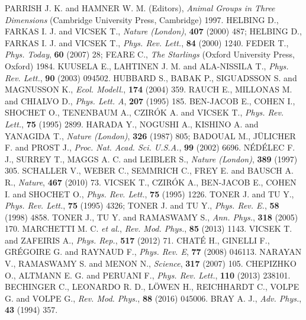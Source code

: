 \documentclass[pre,twocolumn,amssymb,showpacs,superscriptaddress,notitlepage]{revtex4-1}
\begin{document}
\begin{thebibliography}{10}
%
 PARRISH J. K. and HAMNER W. M. (Editors), {\it Animal Groups in Three Dimensions} (Cambridge University Press, Cambridge) 1997.
%
 HELBING D., FARKAS I. J. and VICSEK T., {\it Nature (London)}, {\bf 407} (2000) 487;
HELBING D., FARKAS I. J. and VICSEK T., {\it Phys. Rev. Lett.}, {\bf 84} (2000) 1240.
%
 FEDER T., {\it Phys. Today}, {\bf 60} (2007) 28; 
FEARE C., {\it The Starlings} (Oxford University Press, Oxford) 1984.
%
 KUUSELA E., LAHTINEN J. M. and ALA-NISSILA T., {\it Phys. Rev. Lett.}, {\bf 90} (2003) 094502.
%
 HUBBARD S., BABAK P., SIGUADSSON S. and MAGNUSSON K., {\it Ecol. Modell.}, {\bf 174} (2004) 359.
%
 RAUCH E., MILLONAS M. and CHIALVO D., {\it Phys. Lett. A}, {\bf 207} (1995) 185.
%
 BEN-JACOB E., COHEN I., SHOCHET O., TENENBAUM A., CZIR\'{O}K A. and VICSEK T., {\it Phys. Rev. Lett.}, {\bf 75} (1995) 2899.
%
 HARADA Y., NOGUSHI A., KISHINO A. and YANAGIDA T., {\it Nature (London)}, {\bf 326} (1987) 805;
BADOUAL M., J\"{U}LICHER F. and PROST J., {\it Proc. Nat. Acad. Sci. U.S.A.}, {\bf 99} (2002) 6696.
%
 N\'{E}D\'{E}LEC F. J., SURREY T., MAGGS A. C. and LEIBLER S., {\it Nature (London)}, {\bf 389} (1997) 305.
%
 SCHALLER V., WEBER C., SEMMRICH C., FREY E. and BAUSCH A. R., {\it Nature}, {\bf 467} (2010) 73.
%
 VICSEK T., CZIR\'{O}K A., BEN-JACOB E., COHEN I. and SHOCHET O., {\it Phys. Rev. Lett.}, {\bf 75} (1995) 1226. 
%
 TONER J. and TU Y., {\it Phys. Rev. Lett.}, {\bf 75} (1995) 4326;
TONER J. and TU Y., {\it Phys. Rev. E.}, {\bf 58} (1998) 4858.
%
 TONER J., TU Y. and RAMASWAMY S., {\it Ann. Phys.}, {\bf 318} (2005) 170.
%
 MARCHETTI M. C. {\it et al.}, {\it Rev. Mod. Phys.}, {\bf 85} (2013) 1143.
%
 VICSEK T. and ZAFEIRIS A., {\it Phys. Rep.}, {\bf 517} (2012) 71.
%
 CHAT\'E H., GINELLI F., GR\'EGOIRE G. and RAYNAUD F., {\it Phys. Rev. E}, {\bf 77} (2008) 046113.
%
 NARAYAN V., RAMASWAMY S. and MENON N., {\it Science}, {\bf 317} (2007) 105.
%
 CHEPIZHKO O., ALTMANN E. G. and PERUANI F., {\it Phys. Rev. Lett.}, {\bf 110} (2013) 238101.
%
 BECHINGER C., LEONARDO R. D., L{\"O}WEN H., REICHHARDT C., VOLPE G. and VOLPE G., {\it Rev. Mod. Phys.}, {\bf 88} (2016) 045006.
%
 BRAY A. J., {\it Adv. Phys.}, {\bf 43} (1994) 357.

\end{thebibliography}
\end{document}
